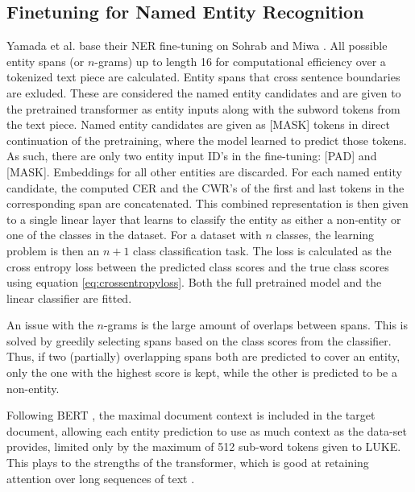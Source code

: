 \documentclass[main.tex]{subfiles}
\begin{document}
\subsection{Finetuning for Named Entity Recognition}
\label{subsec:finetuning-theory}
Yamada et al. base their NER fine-tuning on Sohrab and Miwa \cite{sohrab2018nestedner}.
All possible entity spans (or $n$-grams) up to length 16 for computational efficiency over a tokenized text piece are calculated.
Entity spans that cross sentence boundaries are exluded.
These are considered the named entity candidates and are given to the pretrained transformer as entity inputs along with the subword tokens from the text piece.
Named entity candidates are given as [MASK] tokens in direct continuation of the pretraining, where the model learned to predict those tokens.
As such, there are only two entity input ID's in the fine-tuning: [PAD] and [MASK].
Embeddings for all other entities are discarded.
For each named entity candidate, the computed CER and the CWR's of the first and last tokens in the corresponding span are concatenated.
This combined representation is then given to a single linear layer that learns to classify the entity as either a non-entity or one of the classes in the dataset.
For a dataset with $ n $ classes, the learning problem is then an $ n+1 $ class classification task.
The loss is calculated as the cross entropy loss between the predicted class scores and the true class scores using equation \eqref{eq:crossentropyloss}.
Both the full pretrained model and the linear classifier are fitted.

An issue with the $ n $-grams is the large amount of overlaps between spans.
This is solved by greedily selecting spans based on the class scores from the classifier.
Thus, if two (partially) overlapping spans both are predicted to cover an entity, only the one with the highest score is kept, while the other is predicted to be a non-entity.

Following BERT \cite{devlin2019bert}, the maximal document context is included in the target document, allowing each entity prediction to use as much context as the data-set provides, limited only by the maximum of 512 sub-word tokens given to LUKE.
This plays to the strengths of the transformer, which is good at retaining attention over long sequences of text \cite{vaswani2017att}.
\cite{yamada2020luke}
\end{document}
